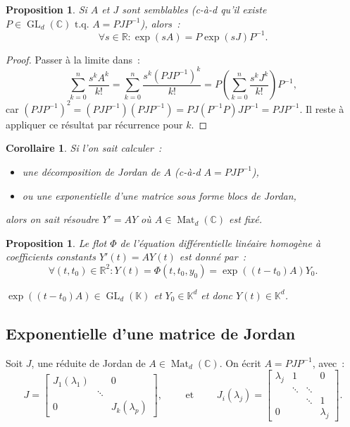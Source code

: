 \documentclass{report}
\newtheorem{prp}[thm]{Proposition}
\newtheorem{cor}[thm]{Corollaire}
\theoremstyle{definition}
\theoremstyle{remark}
\numberwithin{equation}{section}
\newcommand{\K}{\mathbb K}
\newcommand{\C}{\mathbb C}
\newcommand{\R}{\mathbb R}
\newcommand{\tq}{\text{ t.q. }}
\DeclareMathOperator{\Mat}{Mat}
\DeclareMathOperator{\GL}{GL}
\begin{document}
			\begin{prp} Si $A$ et $J$ sont semblables (c-à-d qu'il existe $P \in \GL_d(\C) \tq A = PJP^{-1}$), alors~:
			\begin{equation}
				\forall s \in \R : \exp(sA) = P\exp(sJ)P^{-1}.
			\end{equation}
			\end{prp}

			\begin{proof} Passer à la limite dans~:
			\begin{equation}
				\sum_{k=0}^n\frac {s^kA^k}{k!} = \sum_{k=0}^n\frac {s^k\left(PJP^{-1}\right)^k}{k!} = P\left(\sum_{k=0}^n\frac {s^kJ^k}{k!}\right)P^{-1},
			\end{equation}
			car $(PJP^{-1})^2 = (PJP^{-1})(PJP^{-1}) = PJ(P^{-1}P)JP^{-1} = PJP^{-1}$. Il reste à appliquer ce résultat par récurrence pour $k$.
			\end{proof}

			\begin{cor} Si l'on sait calculer~:
			\begin{itemize}
				\item une décomposition de Jordan de $A$ (c-à-d $A = PJP^{-1}$),
				\item ou une exponentielle d'une matrice sous forme blocs de Jordan,
			\end{itemize}
			alors on sait résoudre $Y' = AY$ où $A \in \Mat_d(\C)$ est fixé.
			\end{cor}

			\begin{prp} Le flot $\Phi$ de l'équation différentielle linéaire homogène à coefficients constants $Y'(t) =AY(t)$ est donné par~:
			\begin{equation}
				\forall (t, t_0) \in \R^2 : Y(t) = \Phi(t, t_0, y_0) = \exp\left((t-t_0)A\right)Y_0.
			\end{equation}

			$\exp\left((t-t_0)A\right) \in \GL_d(\K)$ et $Y_0 \in \K^d$ et donc $Y(t) \in \K^d$.
			\end{prp}

		\subsection{Exponentielle d'une matrice de Jordan}
			Soit $J$, une réduite de Jordan de $A \in \Mat_d(\C)$. On écrit $A = PJP^{-1}$, avec~:
			\begin{equation}
				J =
			\begin{bmatrix}
				J_1(\lambda_1) & & 0 \\
				 & \ddots & \\
				 0 &  & J_k(\lambda_p)
			\end{bmatrix},\qquad\text{ et }\qquad J_i(\lambda_j) =
			\begin{bmatrix}
				\lambda_j & 1 & & 0 \\
				 & \ddots & \ddots & \\
				 & & \ddots & 1 \\
				 0 & & & \lambda_j
			\end{bmatrix}.
			\end{equation}
\end{document}
